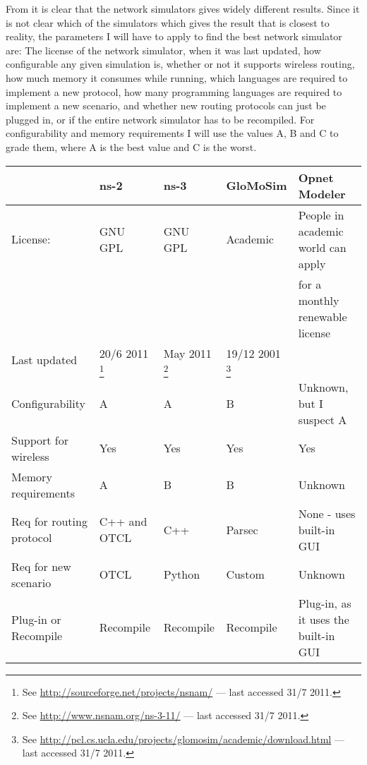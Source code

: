 From \cite{MANcom} it is clear that the network simulators gives widely different results. Since it is not clear which of the simulators which gives the result that is closest to reality, the parameters I will have to apply to find the best network simulator are: The license of the network simulator, when it was last updated, how configurable any given simulation is, whether or not it supports wireless routing, how much memory it consumes while running, which languages are required to implement a new protocol, how many programming languages are required to implement a new scenario, and whether new routing protocols can just be plugged in, or if the entire network simulator has to be recompiled. For configurability and memory requirements I will use the values A, B and C to grade them, where A is the best value and C is the worst.\\
\begin{scriptsize}
\begin{minipage}{15.0cm}
\begin{tabular}[4]{lllll}
                          & ns-2      & ns-3      & GloMoSim & Opnet Modeler \\
\hline
License:                  & GNU GPL   & GNU GPL   & Academic & People in academic world can apply\\        &           &           &          & for a monthly renewable license \\
Last updated              & 20/6 2011
\footnote{\scriptsize{See \url{http://sourceforge.net/projects/nsnam/} --- last accessed 31/7 2011.}} & May 2011
\footnote{\scriptsize{See \url{http://www.nsnam.org/ns-3-11/} --- last accessed 31/7 2011.}} & 19/12 2001
\footnote{\scriptsize{See \url{http://pcl.cs.ucla.edu/projects/glomosim/academic/download.html} --- last accessed 31/7 2011.}}  & \\
Configurability           & A         & A         & B         & Unknown, but I suspect A\\
Support for wireless      & Yes       & Yes       & Yes       & Yes \\
Memory requirements       & A         & B         & B         & Unknown\\
Req for routing protocol  & C++ and OTCL & C++    & Parsec    & None - uses built-in GUI\\
Req for new scenario      & OTCL      & Python    & Custom    & Unknown \\
Plug-in or Recompile      & Recompile & Recompile & Recompile & Plug-in, as it uses the built-in GUI
\end{tabular}
\end{minipage}
\end{scriptsize}

